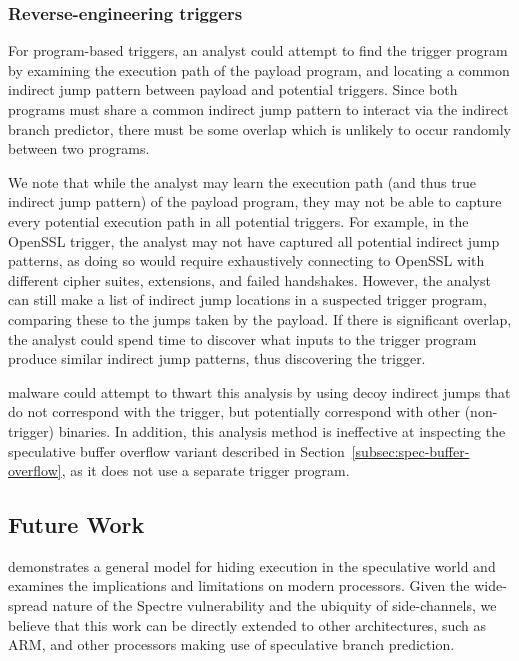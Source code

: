 \subsubsection{Reverse-engineering triggers}
For program-based triggers, an analyst could attempt to find the trigger program
by examining the execution path of the payload program, and locating a common
indirect jump pattern between payload and potential triggers. Since both
programs must share a common indirect jump pattern to interact via the indirect
branch predictor, there must be some overlap which is unlikely to occur randomly
between two programs.

We note that while the analyst may learn the execution path (and thus true
indirect jump pattern) of the payload program, they may not be able to capture
every potential execution path in all potential triggers. For example, in the
OpenSSL trigger, the analyst may not have captured all potential indirect jump
patterns, as doing so would require exhaustively connecting to OpenSSL with
different cipher suites, extensions, and failed handshakes. However, the analyst
can still make a list of indirect jump locations in a suspected trigger program,
comparing these to the jumps taken by the payload. If there is significant
overlap, the analyst could spend time to discover what inputs to the trigger
program produce similar indirect jump patterns, thus discovering the trigger.

\speculake malware could attempt to thwart this analysis by using decoy indirect
jumps that do not correspond with the trigger, but potentially correspond with
other (non-trigger) binaries. In addition, this analysis method is ineffective
at inspecting the speculative buffer overflow variant described in
Section~\ref{subsec:spec-buffer-overflow}, as it does not use a separate trigger
program.

\subsection{Future Work}
\label{subsec:future-work}

\speculake demonstrates a general model for hiding execution in 
the speculative world and examines the implications and limitations on
modern processors. Given the wide-spread nature of the Spectre vulnerability 
and the ubiquity of side-channels, we believe that this work can 
be directly extended to other architectures, such as ARM, and other processors
making use of
speculative branch prediction.

